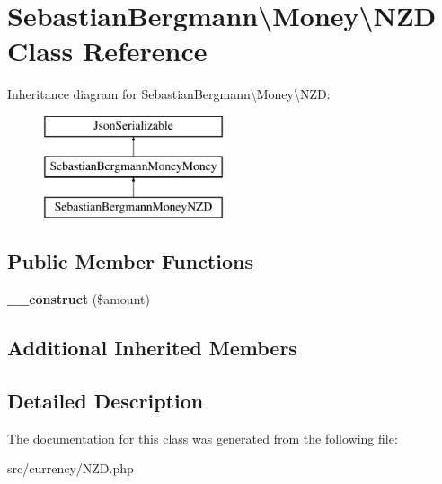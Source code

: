 \hypertarget{classSebastianBergmann_1_1Money_1_1NZD}{}\section{Sebastian\+Bergmann\textbackslash{}Money\textbackslash{}N\+Z\+D Class Reference}
\label{classSebastianBergmann_1_1Money_1_1NZD}
Inheritance diagram for Sebastian\+Bergmann\textbackslash{}Money\textbackslash{}N\+Z\+D\+:\begin{figure}[H]
\begin{center}
\leavevmode
\includegraphics[height=3.000000cm]{classSebastianBergmann_1_1Money_1_1NZD}
\end{center}
\end{figure}
\subsection*{Public Member Functions}
\begin{DoxyCompactItemize}
\item 
\hypertarget{classSebastianBergmann_1_1Money_1_1NZD_a77e9c9825388c9b214ab49f52485a6ba}{}{\bfseries \+\_\+\+\_\+construct} (\$amount)\label{classSebastianBergmann_1_1Money_1_1NZD_a77e9c9825388c9b214ab49f52485a6ba}

\end{DoxyCompactItemize}
\subsection*{Additional Inherited Members}


\subsection{Detailed Description}


The documentation for this class was generated from the following file\+:\begin{DoxyCompactItemize}
\item 
src/currency/N\+Z\+D.\+php\end{DoxyCompactItemize}
